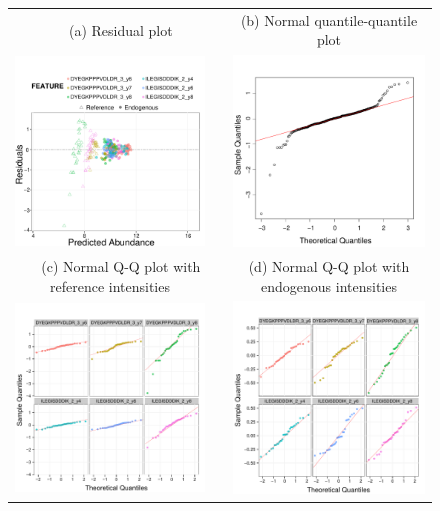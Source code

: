 \documentclass[11pt]{article}
\begin{document}
\begin{figure}[t!]
\begin{center}
\begin{tabular}{ccc}
{\footnotesize $~~~~~~~$(a) Residual plot}& & {\footnotesize (b) Normal quantile-quantile plot} \\
\includegraphics[width=2.25in]{ResidualPlot2.pdf}&&
\includegraphics[width=2.25in]{QQPlot2.pdf}\\ [0.2in]
{\footnotesize $~~~~~~~$(c) Normal Q-Q plot with reference intensities}& & {\footnotesize (d) Normal Q-Q plot with endogenous intensities} \\
\includegraphics[width=2.25in]{SRM_QQPlot_perFeature_heavy.pdf}
&&
\includegraphics[width=2.25in]{SRM_QQPlot_perFeature_light.pdf}

\end{tabular}
\end{center}
\end{figure}
\end{document}
